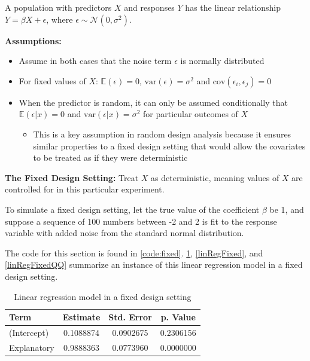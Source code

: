 \documentclass[nohyperref]{article}
\theoremstyle{plain}
\theoremstyle{definition}
\theoremstyle{remark}
\begin{document}
A population with predictors $X$ and responses $Y$ has the linear relationship $Y=\beta X+\epsilon$, where $\epsilon \sim \mathcal{N}(0,\sigma^2)$.

\textbf{Assumptions:} 
\begin{itemize}
    \item Assume in both cases that the noise term $\epsilon$ is normally distributed
    \item For fixed values of $X$:  $\mathbb{E}(\epsilon)=0$, $\text{var}(\epsilon)=\sigma^2$ and $\text{cov}(\epsilon_i,\epsilon_j)=0$
    \item When the predictor is random, it can only be assumed conditionally that $\mathbb{E}(\epsilon|x)=0$ and $\text{var}(\epsilon|x)=\sigma^2$ for particular outcomes of $X$
    \begin{itemize}
        \item This is a key assumption in random design analysis because it ensures similar properties to a fixed design setting that would allow the covariates to be treated as if they were deterministic
    \end{itemize}
\end{itemize}

\cite{HGL2011}

\textbf{The Fixed Design Setting:} Treat $X$ as deterministic, meaning values of $X$ are controlled for in this particular experiment. 


To simulate a fixed design setting, let the true value of the coefficient $\beta$ be 1, and suppose a sequence of 100 numbers between -2 and 2 is fit to the response variable with added noise from the standard normal distribution. 


The code for this section is found in \cref{code:fixed}. \cref{table:linRegFixedTable}, \cref{linRegFixed}, and \cref{linRegFixedQQ} summarize an instance of this linear regression model in a fixed design setting.


\begin{table}[!h]
\vskip 0.15in
\begin{center}
\begin{small}
\begin{sc}
\begin{tabular}{lccc}
\toprule
Term & Estimate & Std. Error & p. Value \\
\midrule
(Intercept) & 0.1088874 & 0.0902675 & 0.2306156 \\
Explanatory & 0.9888363 & 0.0773960 & 0.0000000\\
\bottomrule
\end{tabular}
\end{sc}
\end{small}
\end{center}
\caption{Linear regression model in a fixed design setting}
\label{table:linRegFixedTable}
\vskip -0.1in
\end{table}
\end{document}

